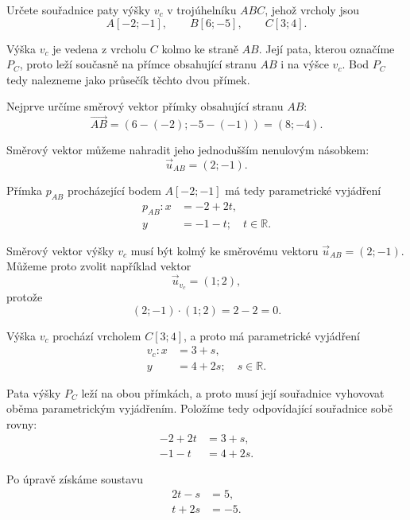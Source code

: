 \begin{example}\label{exa:Foot_of_altitude_parametric_lines}
    Určete souřadnice paty výšky $v_c$ v trojúhelníku $ABC$, jehož
    vrcholy jsou
    \[
        A[-2;-1],\qquad B[6;-5],\qquad C[3;4].
    \]

    Výška $v_c$ je vedena z vrcholu $C$ kolmo ke straně $AB$.
    Její pata, kterou označíme $P_C$, proto leží současně na přímce
    obsahující stranu $AB$ i na výšce $v_c$. Bod $P_C$ tedy nalezneme
    jako průsečík těchto dvou přímek.

    Nejprve určíme směrový vektor přímky obsahující stranu $AB$:
    \[
        \overrightarrow{AB}
        =
        (6-(-2);-5-(-1))
        =
        (8;-4).
    \]

    Směrový vektor můžeme nahradit jeho jednodušším nenulovým násobkem:
    \[
        \vec{u}_{AB}=(2;-1).
    \]

    Přímka $p_{AB}$ procházející bodem $A[-2;-1]$ má tedy parametrické
    vyjádření
    \begin{align*}
        p_{AB}: x &= -2+2t,\\
                y &= -1-t;
                \quad t\in\mathbb{R}.
    \end{align*}

    Směrový vektor výšky $v_c$ musí být kolmý ke směrovému vektoru
    $\vec{u}_{AB}=(2;-1)$. Můžeme proto zvolit například vektor
    \[
        \vec{u}_{v_c}=(1;2),
    \]
    protože
    \[
        (2;-1)\cdot(1;2)=2-2=0.
    \]

    Výška $v_c$ prochází vrcholem $C[3;4]$, a proto má parametrické
    vyjádření
    \begin{align*}
        v_c: x &= 3+s,\\
             y &= 4+2s;
             \quad s\in\mathbb{R}.
    \end{align*}

    Pata výšky $P_C$ leží na obou přímkách, a proto musí její souřadnice
    vyhovovat oběma parametrickým vyjádřením. Položíme tedy odpovídající
    souřadnice sobě rovny:
    \begin{align*}
        -2+2t &= 3+s,\\
        -1-t &= 4+2s.
    \end{align*}

    Po úpravě získáme soustavu
    \begin{align*}
        2t-s &= 5,\\
        t+2s &= -5.
    \end{align*}


\end{example}
